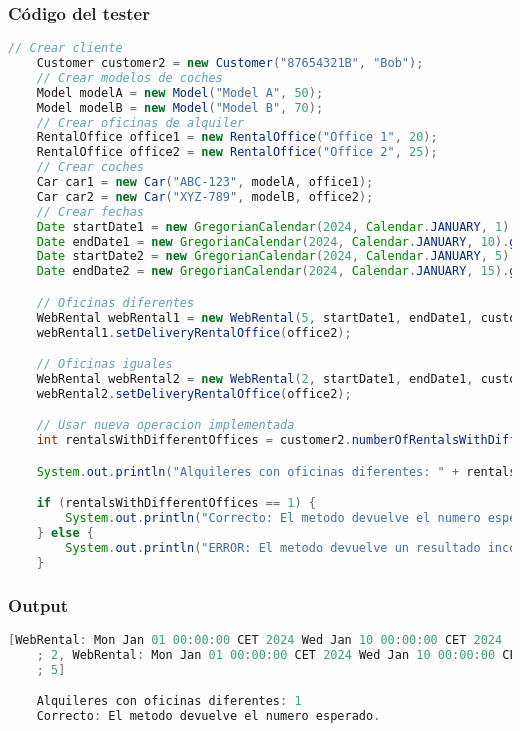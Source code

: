 \subsubsection*{Código del tester}
\begin{lstlisting}[style = javaNormal, language=Java] 
    // Crear cliente
    Customer customer2 = new Customer("87654321B", "Bob");
    // Crear modelos de coches
    Model modelA = new Model("Model A", 50);
    Model modelB = new Model("Model B", 70);
    // Crear oficinas de alquiler
    RentalOffice office1 = new RentalOffice("Office 1", 20);
    RentalOffice office2 = new RentalOffice("Office 2", 25);
    // Crear coches
    Car car1 = new Car("ABC-123", modelA, office1);
    Car car2 = new Car("XYZ-789", modelB, office2);
    // Crear fechas
    Date startDate1 = new GregorianCalendar(2024, Calendar.JANUARY, 1).getTime();
    Date endDate1 = new GregorianCalendar(2024, Calendar.JANUARY, 10).getTime();
    Date startDate2 = new GregorianCalendar(2024, Calendar.JANUARY, 5).getTime();
    Date endDate2 = new GregorianCalendar(2024, Calendar.JANUARY, 15).getTime();

    // Oficinas diferentes
    WebRental webRental1 = new WebRental(5, startDate1, endDate1, customer2, car1, office1);
    webRental1.setDeliveryRentalOffice(office2);

    // Oficinas iguales
    WebRental webRental2 = new WebRental(2, startDate1, endDate1, customer2, car2, office2);
    webRental2.setDeliveryRentalOffice(office2);

    // Usar nueva operacion implementada
    int rentalsWithDifferentOffices = customer2.numberOfRentalsWithDifferentOffices();

    System.out.println("Alquileres con oficinas diferentes: " + rentalsWithDifferentOffices);

    if (rentalsWithDifferentOffices == 1) {
        System.out.println("Correcto: El metodo devuelve el numero esperado.");
    } else {
        System.out.println("ERROR: El metodo devuelve un resultado incorrecto.");
    }
\end{lstlisting}


\subsubsection*{Output}

\begin{lstlisting}[style = javaNormal, language=Java] 
    [WebRental: Mon Jan 01 00:00:00 CET 2024 Wed Jan 10 00:00:00 CET 2024
    ; 2, WebRental: Mon Jan 01 00:00:00 CET 2024 Wed Jan 10 00:00:00 CET 2024
    ; 5]

    Alquileres con oficinas diferentes: 1
    Correcto: El metodo devuelve el numero esperado.
\end{lstlisting}


